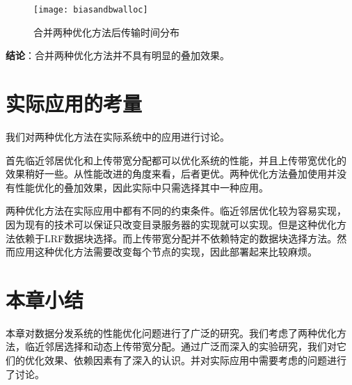 \begin{figure}
  \centering
  \begin{minipage}{0.6\linewidth}
    \centering
    \texttt{[image: biasandbwalloc]}
    \caption{合并两种优化方法后传输时间分布}
    \label{fig:biasandbwalloc}
  \end{minipage}
\end{figure}

\textbf{结论}：合并两种优化方法并不具有明显的叠加效果。


\section{实际应用的考量}
\label{sec:btsuggest}

我们对两种优化方法在实际系统中的应用进行讨论。

首先临近邻居优化和上传带宽分配都可以优化系统的性能，并且上传带宽优化的
效果稍好一些。从性能改进的角度来看，后者更优。两种优化方法叠加使用并没
有性能优化的叠加效果，因此实际中只需选择其中一种应用。

两种优化方法在实际应用中都有不同的约束条件。临近邻居优化较为容易实现，
因为现有的技术可以保证只改变目录服务器的实现就可以实现。但是这种优化方
法依赖于LRF数据块选择。而上传带宽分配并不依赖特定的数据块选择方法。然
而应用这种优化方法需要改变每个节点的实现，因此部署起来比较麻烦。

\section{本章小结}
\label{sec:btconclude}

本章对数据分发系统的性能优化问题进行了广泛的研究。我们考虑了两种优化方
法，临近邻居选择和动态上传带宽分配。通过广泛而深入的实验研究，我们对它
们的优化效果、依赖因素有了深入的认识。并对实际应用中需要考虑的问题进行
了讨论。
